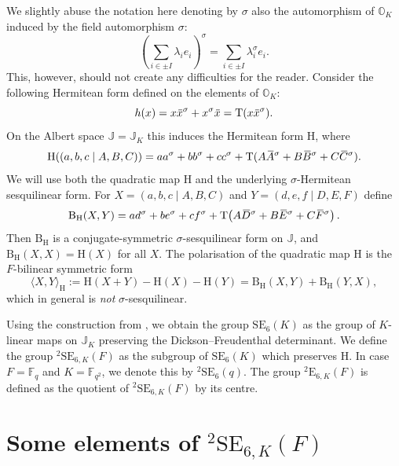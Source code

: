 \documentclass{amsart}
\def\ovA{\mathord{\mbox{\hspace*{0pt}}\,\overline{\!A\!\!\;}\!\:}\mbox{\hspace*{0pt}}}
\def\ovB{\mathord{\mbox{\hspace*{0pt}}\,\overline{\!B\!\!\;}\!\:}\mbox{\hspace*{0pt}}}
\def\ovC{\mathord{\mbox{\hspace*{0pt}}\,\overline{\!C\!\!\;}\!\:}\mbox{\hspace*{0pt}}}
\def\ovD{\mathord{\mbox{\hspace*{0pt}}\,\overline{\!D\!\!\;}\!\:}\mbox{\hspace*{0pt}}}
\def\ovE{\mathord{\mbox{\hspace*{0pt}}\,\overline{\!E\!\!\;}\!\:}\mbox{\hspace*{0pt}}}
\def\ovF{\mathord{\mbox{\hspace*{0pt}}\,\overline{\!F\!\!\;}\!\:}\mbox{\hspace*{0pt}}}
\def\ovx{\mathord{\mbox{\hspace*{0pt}}\,\overline{\!x\!\!\;}\!\:}\mbox{\hspace*{0pt}}}
\def\OO{\mathord{\mathbb{O}}}
\newcommand{\Fq}{\mathbb{F}_q}
\newcommand{\Fqs}{\mathbb{F}_{q^2}}
\newcommand{\SE}{\mathrm{SE}}
\newcommand{\E}{\mathrm{E}}
\newcommand{\Tr}{\operatorname{T}}
\newcommand{\J}{\mathbb{J}}
\newcommand{\B}{\mathrm{B}}
\renewcommand{\H}{\mathrm{H}}
\newcommand{\s}{\sigma}
\newcommand{\inner}[2]{\langle #1, #2 \rangle}
\theoremstyle{plain}
\numberwithin{theorem}{section}
\theoremstyle{definition}
\begin{document}
We slightly abuse the notation here denoting by $\s$ also the automorphism of $\OO_K$ induced by the field automorphism $\sigma$:
\begin{equation}
	\left( \sum_{i\in \pm I} \lambda_i e_i \right)^{\s} = 
	\sum_{i\in \pm I} \lambda_{i}^{\sigma} e_i. 
\end{equation}
This, however, should not create any difficulties for the reader. Consider the following Hermitean form defined on the elements
of $\OO_K$:
\begin{equation}
	h(x) = x \ovx^{\s} + x^{\s} \ovx = \Tr(x \ovx^{\s}).
\end{equation}
On the Albert space $\J = \J_K$ this induces the Hermitean form $\H$, where
\begin{equation}
	\H( (a,b,c\mid A,B,C) ) = 
		a a^{\s} + b b^{\s} + c c^{\s} + 
		\Tr(A \ovA^{\s} + B\ovB^{\s} + C\ovC^{\s}).
\end{equation}
We will use both the quadratic map $\H$ and the underlying $\s$-Hermitean sesquilinear form.
For \mbox{$X=(a,b,c\mid A,B,C)$} and \mbox{$Y=(d,e,f\mid D,E,F)$} define
\begin{equation}
	\label{eq:4_B_sesquilinear}
	\B_{\H}(X,Y)= a d^{\s}+b e^{\s}+c f^{\s}+
		\Tr\!\left(A\ovD^{\s}+B\ovE^{\s}+C\ovF^{\s}\right).
\end{equation}
Then $\B_{\H}$ is a conjugate-symmetric $\s$-sesquilinear form on $\J$, and $\B_{\H}(X,X)=\H(X)$ for all $X$.
The polarisation of the quadratic map $\H$ is the $F$-bilinear symmetric form
\begin{equation}
	\inner{X}{Y}_{\H}:=\H(X+Y)-\H(X)-\H(Y)=\B_{\H}(X,Y)+\B_{\H}(Y,X),
\end{equation}
which in general is \emph{not} $\s$-sesquilinear.

Using the construction from \cite{BSW1}, we obtain the group $\SE_6(K)$ as the group of $K$-linear maps on $\J_K$ 
preserving the Dickson--Freudenthal determinant. We define the group ${}^2\SE_{6,K}(F)$ as the subgroup of $\SE_6(K)$ 
which preserves $\H$. In case $F = \Fq$ and $K = \Fqs$, we denote this by ${}^2\SE_6(q)$. The group ${}^2\E_{6,K}(F)$ 
is defined as the quotient of ${}^2\SE_{6,K}(F)$ by its centre.

\section{Some elements of ${}^2\SE_{6,K}(F)$}
\end{document}
